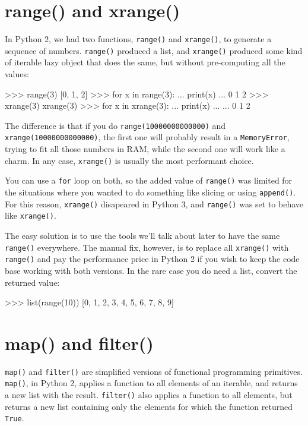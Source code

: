 \section{range() and xrange()}

In Python 2, we had two functions, \lstinline{range()} and \lstinline{xrange()}, to generate a sequence of numbers. \lstinline{range()} produced a list, and \lstinline{xrange()} produced some kind of iterable lazy object that does the same, but without pre-computing all the values:

\begin{py2}
>>> range(3)
[0, 1, 2]
>>> for x in range(3):
...     print(x)
...
0
1
2
>>> xrange(3)
xrange(3)
>>> for x in xrange(3):
...     print(x)
...
...
0
1
2
\end{py2}

The difference is that if you do \lstinline{range(10000000000000)} and \lstinline{xrange(10000000000000)}, the first one will probably result in a \lstinline{MemoryError}, trying to fit all those numbers in RAM, while the second one will work like a charm. In any case, \lstinline{xrange()} is usually the most performant choice.

You can use a \lstinline{for} loop on both, so the added value of \lstinline{range()} was limited for the situations where you wanted to do something like slicing or using \lstinline{append()}. For this reason, \lstinline{xrange()} disapeared in Python 3, and \lstinline{range()} was set to behave like \lstinline{xrange()}.

The easy solution is to use the tools we'll talk about later to have the same \lstinline{range()} everywhere. The manual fix, however, is to replace all \lstinline{xrange()} with \lstinline{range()} and pay the performance price in Python 2 if you wish to keep the code base working with both versions. In the rare case you do need a list, convert the returned value:

\begin{py2and3}
>>> list(range(10))
[0, 1, 2, 3, 4, 5, 6, 7, 8, 9]
\end{py2and3}

\section{map() and filter()}

\lstinline{map()} and \lstinline{filter()} are simplified versions of functional programming primitives. \lstinline{map()}, in Python 2, applies a function to all elements of an \gls{iterable}, and returns a new list with the result. \lstinline{filter()} also applies a function to all elements, but returns a new list containing only the elements for which the function returned \lstinline{True}.

